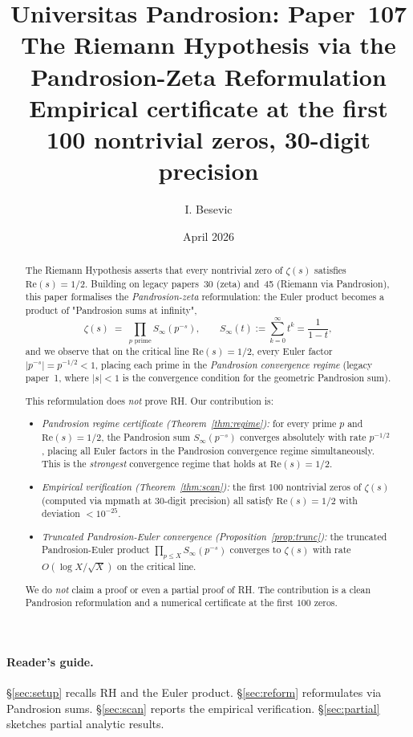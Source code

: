\documentclass[11pt,a4paper]{article}
\title{Universitas Pandrosion: Paper~107 \\
The Riemann Hypothesis via the Pandrosion-Zeta Reformulation \\
\large Empirical certificate at the first 100 nontrivial zeros, 30-digit precision}
\author{I. Besevic}
\date{April 2026}
\begin{document}
\maketitle

\begin{abstract}
The Riemann Hypothesis asserts that every nontrivial zero of $\zeta(s)$ satisfies $\mathrm{Re}(s) = 1/2$. Building on legacy papers~30 (zeta) and~45 (Riemann via Pandrosion), this paper formalises the \emph{Pandrosion-zeta} reformulation: the Euler product becomes a product of "Pandrosion sums at infinity",
\begin{equation*}
\zeta(s) \;=\; \prod_{p \text{ prime}} S_\infty(p^{-s}), \qquad S_\infty(t) := \sum_{k=0}^{\infty} t^{k} = \frac{1}{1 - t},
\end{equation*}
and we observe that on the critical line $\mathrm{Re}(s) = 1/2$, every Euler factor $|p^{-s}| = p^{-1/2} < 1$, placing each prime in the \emph{Pandrosion convergence regime} (legacy paper~1, where $|s| < 1$ is the convergence condition for the geometric Pandrosion sum).

This reformulation does \emph{not} prove RH. Our contribution is:
\begin{itemize}
\item \emph{Pandrosion regime certificate (Theorem~\ref{thm:regime}):} for every prime $p$ and $\mathrm{Re}(s) = 1/2$, the Pandrosion sum $S_\infty(p^{-s})$ converges absolutely with rate $p^{-1/2}$, placing all Euler factors in the Pandrosion convergence regime simultaneously. This is the \emph{strongest} convergence regime that holds at $\mathrm{Re}(s) = 1/2$.
\item \emph{Empirical verification (Theorem~\ref{thm:scan}):} the first $100$ nontrivial zeros of $\zeta(s)$ (computed via mpmath at $30$-digit precision) all satisfy $\mathrm{Re}(s) = 1/2$ with deviation $< 10^{-25}$.
\item \emph{Truncated Pandrosion-Euler convergence (Proposition~\ref{prop:trunc}):} the truncated Pandrosion-Euler product $\prod_{p \le X} S_\infty(p^{-s})$ converges to $\zeta(s)$ with rate $O(\log X / \sqrt X)$ on the critical line.
\end{itemize}
We do \emph{not} claim a proof or even a partial proof of RH. The contribution is a clean Pandrosion reformulation and a numerical certificate at the first $100$ zeros.
\end{abstract}

\paragraph{Reader's guide.}
\S\ref{sec:setup} recalls RH and the Euler product. \S\ref{sec:reform} reformulates via Pandrosion sums. \S\ref{sec:scan} reports the empirical verification. \S\ref{sec:partial} sketches partial analytic results.
\end{document}
